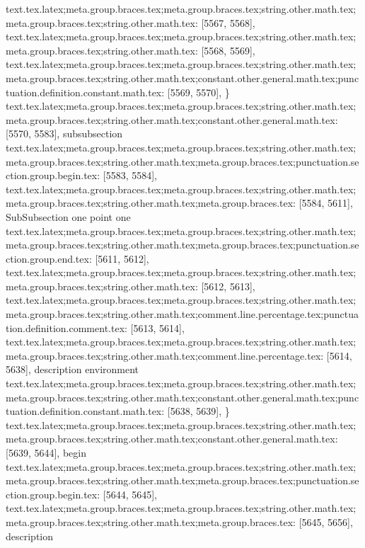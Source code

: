 {{{{{{{{{{{{{{{{{{{{{{{{{{{{{{{{{{{{{{{{{{{{{{{{{{{{{{{{{{{{{{{{{{{{{{{{{{{{{{{{{{{{{{{{{{{{{{{{{{{{{{{{{{{{{{{{{{{{{{{{{{{{{{{{{{{{{{{{{{{{{{{{{{{{{{{{text.tex.latex;meta.group.braces.tex;meta.group.braces.tex;string.other.math.tex;meta.group.braces.tex;string.other.math.tex: [5567, 5568], {
}
text.tex.latex;meta.group.braces.tex;meta.group.braces.tex;string.other.math.tex;meta.group.braces.tex;string.other.math.tex: [5568, 5569], {
}
text.tex.latex;meta.group.braces.tex;meta.group.braces.tex;string.other.math.tex;meta.group.braces.tex;string.other.math.tex;constant.other.general.math.tex;punctuation.definition.constant.math.tex: [5569, 5570], {\}
text.tex.latex;meta.group.braces.tex;meta.group.braces.tex;string.other.math.tex;meta.group.braces.tex;string.other.math.tex;constant.other.general.math.tex: [5570, 5583], {subsubsection}
text.tex.latex;meta.group.braces.tex;meta.group.braces.tex;string.other.math.tex;meta.group.braces.tex;string.other.math.tex;meta.group.braces.tex;punctuation.section.group.begin.tex: [5583, 5584], {{}
text.tex.latex;meta.group.braces.tex;meta.group.braces.tex;string.other.math.tex;meta.group.braces.tex;string.other.math.tex;meta.group.braces.tex: [5584, 5611], {SubSubsection one point one}
text.tex.latex;meta.group.braces.tex;meta.group.braces.tex;string.other.math.tex;meta.group.braces.tex;string.other.math.tex;meta.group.braces.tex;punctuation.section.group.end.tex: [5611, 5612], {}}
text.tex.latex;meta.group.braces.tex;meta.group.braces.tex;string.other.math.tex;meta.group.braces.tex;string.other.math.tex: [5612, 5613], {
}
text.tex.latex;meta.group.braces.tex;meta.group.braces.tex;string.other.math.tex;meta.group.braces.tex;string.other.math.tex;comment.line.percentage.tex;punctuation.definition.comment.tex: [5613, 5614], {%
text.tex.latex;meta.group.braces.tex;meta.group.braces.tex;string.other.math.tex;meta.group.braces.tex;string.other.math.tex;comment.line.percentage.tex: [5614, 5638], {description environment
}
text.tex.latex;meta.group.braces.tex;meta.group.braces.tex;string.other.math.tex;meta.group.braces.tex;string.other.math.tex;constant.other.general.math.tex;punctuation.definition.constant.math.tex: [5638, 5639], {\}
text.tex.latex;meta.group.braces.tex;meta.group.braces.tex;string.other.math.tex;meta.group.braces.tex;string.other.math.tex;constant.other.general.math.tex: [5639, 5644], {begin}
text.tex.latex;meta.group.braces.tex;meta.group.braces.tex;string.other.math.tex;meta.group.braces.tex;string.other.math.tex;meta.group.braces.tex;punctuation.section.group.begin.tex: [5644, 5645], {{}
text.tex.latex;meta.group.braces.tex;meta.group.braces.tex;string.other.math.tex;meta.group.braces.tex;string.other.math.tex;meta.group.braces.tex: [5645, 5656], {description}
}}}}}}}}}}}}}}}}}}}}}}}}}}}}}}}}}}}}}}}}}}}}}}}}}}}}}}}}}}}}}}}}}}}}}}}}}}}}}}}}}}}}}}}}}}}}}}}}}}}}}}}}}}}}}}}}}}}}}}}}}}}}}}}}}}}}}}}}}}}}}}}}}}}}}}}}}}}}
